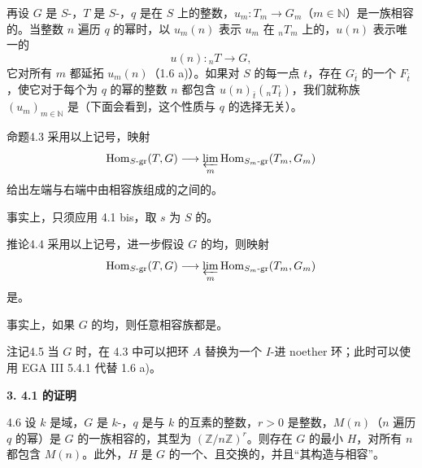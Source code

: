 再设 $G$ 是 $S$-，$T$ 是 $S$-，$q$ 是在 $S$ 上的整数，$u_m:T_m\to G_m$（$m\in\mathbb N$）是一族相容的。当整数 $n$ 遍历 $q$ 的幂时，以 $u_m(n)$ 表示 $u_m$ 在 ${}_nT_m$ 上的，$u(n)$ 表示唯一的
\[u(n):{}_nT\longrightarrow G,\]
它对所有 $m$ 都延拓 $u_m(n)$（1.6 a)）。如果对 $S$ 的每一点 $t$，存在 $G_{\bar t}$ 的一个 $F_{\bar t}$，使它对于每个为 $q$ 的幂的整数 $n$ 都包含 $u(n)_{\bar t}({}_nT_{\bar t})$，我们就称族 $(u_m)_{m\in\mathbb N}$ 是（下面会看到，这个性质与 $q$ 的选择无关）。
\begin{SGAresult}{命题}{4.3}
采用以上记号，映射
\[\operatorname{Hom}_{S\text{-gr}}(T,G)\longrightarrow\varprojlim_m\operatorname{Hom}_{S_m\text{-gr}}(T_m,G_m)\]
给出左端与右端中由相容族组成的之间的。
\end{SGAresult}
事实上，只须应用 4.1 bis，取 $s$ 为 $S$ 的。
\begin{SGAresult}{推论}{4.4}
采用以上记号，进一步假设 $G$ 的均，则映射
\[\operatorname{Hom}_{S\text{-gr}}(T,G)\longrightarrow\varprojlim_m\operatorname{Hom}_{S_m\text{-gr}}(T_m,G_m)\]
是。
\end{SGAresult}
事实上，如果 $G$ 的均，则任意相容族都是。
\begin{SGAresult}{注记}{4.5}
当 $G$ 时，在 4.3 中可以把环 $A$ 替换为一个 $I$-进 noether 环；此时可以使用 EGA III 5.4.1 代替 1.6 a)。
\end{SGAresult}
\textbf{3. 4.1 的证明}
\begin{SGAresult}{}{4.6}
设 $k$ 是域，$G$ 是 $k$-，$q$ 是与 $k$ 的互素的整数，$r>0$ 是整数，$M(n)$（$n$ 遍历 $q$ 的幂）是 $G$ 的一族相容的，其型为 $(\mathbb Z/n\mathbb Z)^r$。则存在 $G$ 的最小 $H$，对所有 $n$ 都包含 $M(n)$。此外，$H$ 是 $G$ 的一个、且交换的，并且“其构造与相容”。
\end{SGAresult}
